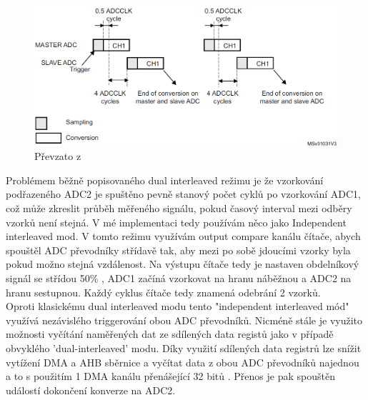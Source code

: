 \begin{figure}[H]
	\centering
	\includegraphics[width=0.7\linewidth]{Figs/Screenshots/DualInterleaved}
	\caption{Převzato z \cite{refG4}}
	\label{fig:dualinterleaved}
\end{figure}

Problémem běžně popisovaného dual interleaved režimu je že vzorkování podřazeného ADC2 je spuštěno pevně stanový počet cyklů po vzorkování ADC1, což může zkreslit průběh měřeného signálu, pokud časový interval mezi odběry vzorků není stejná. V mé implementaci tedy používám něco jako Independent interleaved mod. V tomto režimu využívám output compare kanálu čítače,  abych spouštěl ADC převodníky střídavě tak, aby mezi po sobě jdoucími vzorky byla pokud možno stejná vzdálenost. Na výstupu čítače tedy je nastaven obdelníkový signál se střídou 50\% , ADC1 začíná vzorkovat na hranu náběžnou a ADC2 na hranu sestupnou. Každý cyklus čítače tedy  znamená odebrání 2 vzorků.\\

Oproti klasickému dual interleaved modu tento "independent interleaved mód" využívá nezávislého triggerování obou ADC převodníků. Nicméně stále je využito možnosti vyčítání naměřených dat ze sdílených data registů jako v případě obvyklého 'dual-interleaved' modu. Díky využití sdílených data registrů lze snížit vytížení DMA a AHB sběrnice a vyčítat data z obou ADC převodníků najednou a to s použitím 1 DMA kanálu přenášející 32 bitů . Přenos je pak spouštěn událostí dokončení konverze na ADC2.




